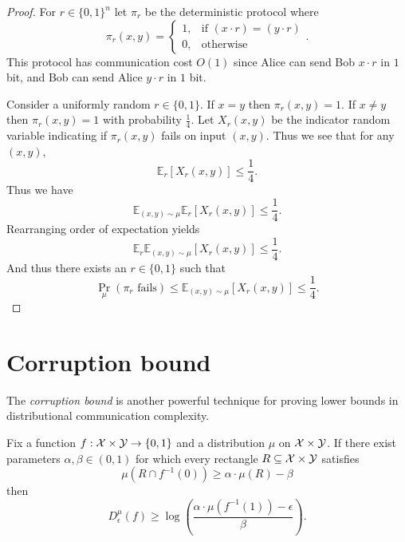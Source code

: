 \begin{proof}
For $r \in \{0,1\}^n$ let  $\pi_r$ be the deterministic protocol where 
$$\pi_r(x,y) = \begin{cases} 1, &\text{if } (x\cdot r)  = (y\cdot r) \\ 0, &\text{otherwise}\end{cases}.$$
This protocol has communication cost $O(1)$ since Alice can send Bob $x\cdot r$ in $1$ bit, and Bob can send Alice $y \cdot r$ in $1$ bit.

Consider a uniformly random $r \in \{0,1\}$. If $x=y$ then $\pi_r(x,y) = 1$. If $x\neq y$ then $\pi_r(x,y) =1$ with probability $\frac{1}{4}$. Let $X_r(x,y)$ be the indicator random variable indicating if $\pi_r(x,y)$ fails on input $(x,y)$. Thus we see that for any $(x,y)$,
$$\mathbb{E}_r[X_r(x,y)] \leq \frac{1}{4}.$$
Thus we have
$$\mathbb{E}_{(x,y)\sim \mu}\mathbb{E}_r[X_r(x,y)] \leq \frac{1}{4}.$$
Rearranging order of expectation yields
$$\mathbb{E}_{r}\mathbb{E}_{(x,y)\sim \mu}[X_r(x,y)] \leq \frac{1}{4}.$$
And thus there exists an $r \in \{0,1\}$ such that
$$\Pr_\mu(\pi_r \text{ fails}) \leq \mathbb{E}_{(x,y)\sim \mu}[X_r(x,y)] \leq \frac{1}{4}.$$
\end{proof}



\newpage \section{Corruption bound}

The \emph{corruption bound} is another powerful technique for proving lower bounds in distributional communication complexity.

\begin{lemma}
Fix a function $f : \mathcal{X} \times \mathcal{Y} \to \{0,1\}$ and a distribution
$\mu$ on $\mathcal{X} \times \mathcal{Y}$.
If there exist parameters $\alpha, \beta \in (0,1)$ for which
every rectangle $R \subseteq \mathcal{X} \times \mathcal{Y}$ satisfies 
\[
\mu(R \cap f^{-1}(0)) \ge \alpha \cdot \mu(R) - \beta
\]
then
\[
D^\mu_\epsilon(f) \ge \log\left( \frac{\alpha \cdot \mu(f^{-1}(1)) - \epsilon}{\beta}\right).
\]
\end{lemma}

